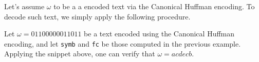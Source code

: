 \documentclass{subfiles}
\begin{document}
    Let's assume \(\omega\) to be a a encoded text via the Canonical Huffman encoding.
    To decode such text, we simply apply the following procedure.
    
    \begin{example*}
        Let \(\omega = 01 10 000 001 10 11\) be a text encoded using the Canonical Huffman encoding,
            and let \lstinline{symb} and \lstinline{fc} be those computed in the previous example.
        Applying the snippet above, one can verify that \(\omega = acdecb\).
    \end{example*}
\end{document}
